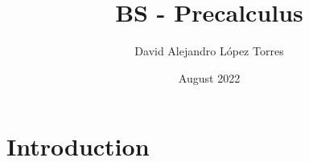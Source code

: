 \documentclass[11pt,letterpaper,spanish]{article}
\title{BS - Precalculus}
\author{David Alejandro L\'opez Torres}
\date{August 2022}
\theoremstyle{definition}
\begin{document}
\maketitle

\section{Introduction}
\end{document}
